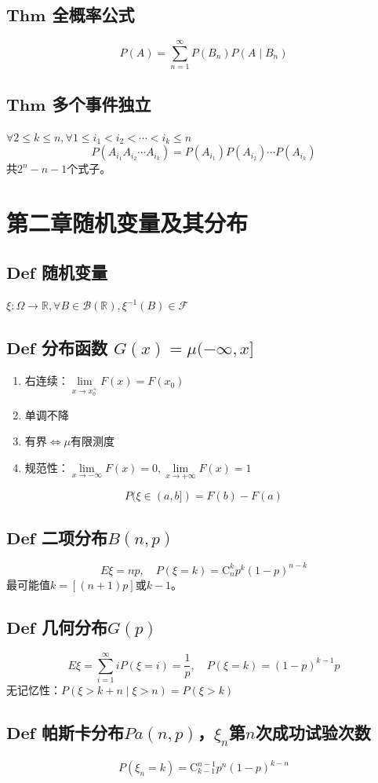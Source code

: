 \documentclass{article}
\begin{document}
	\subsection{$\bm{Thm}$ 全概率公式}
	\[
	P(A)=\sum_{n=1}^{\infty}P(B_n)P(A\mid B_n)
	\]
	\subsection{$\bm{Thm}$ 多个事件独立}
	$\forall 2\le k\le n,\forall 1\le i_1<i_2<\cdots<i_k\le n$
	\[
	P(A_{i_1}A_{i_2}\cdots A_{i_k})=P(A_{i_1})P(A_{i_2})\cdots P(A_{i_k})
	\]
	共$2^n-n-1$个式子。
	
	\section{第二章\quad 随机变量及其分布}
	\subsection{$\bm{Def}$ 随机变量}
	$\xi:\Omega\to\mathbb{R},\forall B\in\mathcal{B}(\mathbb{R}),\xi^{-1}(B)\in\mathcal{F}$
	\subsection{$\bm{Def}$ 分布函数 $G(x)=\mu(-\infty,x]$}
	\begin{enumerate}
		\item 右连续：$\lim\limits_{x\to x_0^+}F(x)=F(x_0)$
		\item 单调不降
		\item 有界$\iff \mu$有限测度
		\item 规范性：$\lim\limits_{x\to-\infty}F(x)=0,\lim\limits_{x\to+\infty}F(x)=1$
	\end{enumerate}
	\[
	P(\xi\in(a,b])=F(b)-F(a)
	\]
	\subsection{$\bm{Def}$ 二项分布$B(n,p)$}
	\[
	E\xi=np,\quad P(\xi=k)=\mathrm{C}_n^kp^k(1-p)^{n-k}
	\]
	最可能值$k=[(n+1)p]$或$k-1$。
	\subsection{$\bm{Def}$ 几何分布$G(p)$}
	\[
	E\xi=\sum_{i=1}^{\infty}iP(\xi=i)=\frac1p,\quad P(\xi=k)=(1-p)^{k-1}p
	\]
	无记忆性：$P(\xi>k+n\mid\xi>n)=P(\xi>k)$
	\subsection{$\bm{Def}$ 帕斯卡分布$Pa(n,p)$，$\xi_n$第$n$次成功试验次数}
	\[
	P(\xi_n=k)=\mathrm{C}_{k-1}^{n-1}p^n(1-p)^{k-n}
	\]
\end{document}
